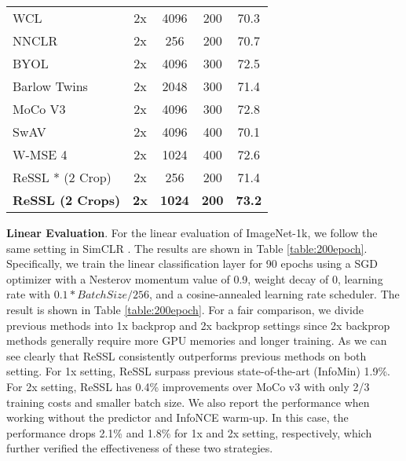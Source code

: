 \documentclass{article}
\newcommand{\<}{\left\langle}
\renewcommand{\>}{\right\rangle}
\begin{document}
\begin{table}[h]
\begin{tabular}{l c c c c }
WCL \cite{WCL}   & 2x  & 4096 & 200 & 70.3 \\
NNCLR \cite{nnclr}   & 2x  & 256 & 200 & 70.7 \\ 
BYOL \cite{byol}       & 2x  & 4096 & 300 & 72.5 \\
Barlow Twins \cite{barlowtwins}       & 2x  & 2048 & 300 & 71.4 \\
MoCo V3 \cite{mocov3}  & 2x  & 4096 & 300 & 72.8 \\
SwAV \cite{swav}                         & 2x &  4096 &  400 & 70.1 \\
W-MSE 4 \cite{wmse}   & 2x & 1024 & 400 & 72.6 \\
\textcolor{collapsed}{ReSSL * (2 Crop) \cite{ressl}} & \textcolor{collapsed}{2x}  & \textcolor{collapsed}{256} &  \textcolor{collapsed}{200} & \textcolor{collapsed}{71.4} \\
\textbf{ReSSL (2 Crops)}   & \textbf{2x}  & \textbf{1024} &  \textbf{200} & \textbf{73.2} \\
\bottomrule
\end{tabular}
\vspace{-8pt}
\end{table}



\textbf{Linear Evaluation}.
For the linear evaluation of ImageNet-1k, we follow the same setting in SimCLR \cite{swav}.  The results are shown in Table \ref{table:200epoch}. Specifically, we train the linear classification layer for 90 epochs using a SGD optimizer with a Nesterov momentum value of 0.9, weight decay of 0, learning rate with $0.1 * BatchSize / 256$, and a cosine-annealed learning rate scheduler. The result is shown in Table \ref{table:200epoch}. For a fair comparison, we divide previous methods into 1x backprop and 2x backprop settings since 2x backprop methods generally require more GPU memories and longer training. As we can see clearly that ReSSL consistently outperforms previous methods on both setting. For 1x setting, ReSSL surpass previous state-of-the-art (InfoMin) 1.9\%. For 2x setting, ReSSL has 0.4\% improvements over MoCo v3 with only 2/3 training costs and smaller batch size. We also report the performance when working without the predictor and InfoNCE warm-up. In this case, the performance drops 2.1\% and 1.8\% for 1x and 2x setting, respectively, which further verified the effectiveness of these two strategies.
\end{document}
